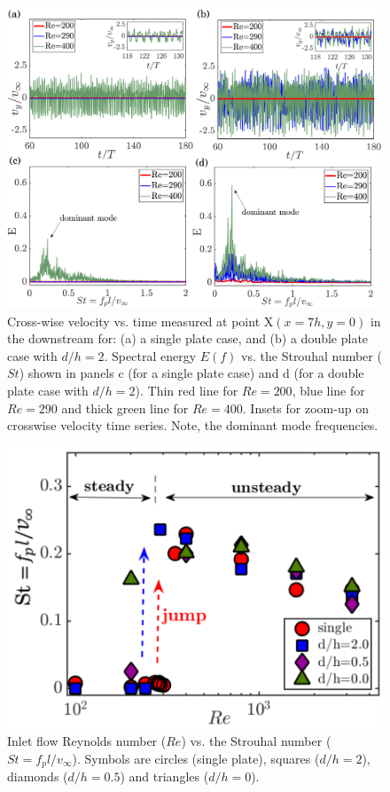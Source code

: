 \documentclass[aps,pre,twocolumn,aps,longbibliography]{revtex4-1}
\begin{document}
	
	\begin{figure}[b]
		\begin{minipage}[c]{1\linewidth}
			\includegraphics[width=1\linewidth]{Fig12.pdf} 
		\end{minipage} 
		\caption{Cross-wise velocity vs. time measured at point {\normalsize{X}}$(x=7h,y=0)$ in the downstream for: (a) a single plate case, and (b) a double plate case with $d/h=2$. Spectral energy $E(f)$ vs. the Strouhal number ($St$) shown in panels c (for a single plate case) and d (for a double plate case with $d/h=2$). Thin red line for $Re=200$, blue line for $Re=290$ and thick green line for $Re=400$. Insets for zoom-up on crosswise velocity time series. Note, the dominant mode frequencies.}
		\label{fig:t_vs_vy}
		
	\end{figure} 
	
	
	\begin{figure}
		\begin{minipage}[c]{1\linewidth}
			\includegraphics[width=0.90\linewidth]{Fig13.pdf} 
		\end{minipage} 
		\caption{Inlet flow Reynolds number ($Re$) vs. the Strouhal number ($St=f_pl/{v_{\infty}}$). Symbols are circles (single plate), squares ($d/h=2$), diamonds ($d/h=0.5$) and triangles ($d/h=0$).}
		\label{fig:Re_vs_St}
	\end{figure}
	
\end{document}
